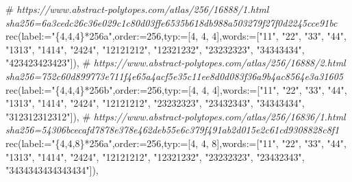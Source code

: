 \documentclass[
  10pt,
  letterpaper,
]{article}
\newenvironment{Shaded}{}{}
\newcommand{\CommentTok}[1]{\textcolor[rgb]{0.38,0.63,0.69}{\textit{#1}}}
\newcommand{\ExtensionTok}[1]{#1}
\newcommand{\FloatTok}[1]{\textcolor[rgb]{0.25,0.63,0.44}{#1}}
\newcommand{\NormalTok}[1]{#1}
\newcommand{\OperatorTok}[1]{\textcolor[rgb]{0.40,0.40,0.40}{#1}}
\newcommand{\StringTok}[1]{\textcolor[rgb]{0.25,0.44,0.63}{#1}}
\newcommand{\VariableTok}[1]{\textcolor[rgb]{0.10,0.09,0.49}{#1}}
\begin{document}
\begin{Shaded}
\begin{Highlighting}[]
\NormalTok{\#}\CommentTok{ https://www.abstract{-}polytopes.com/atlas/256/16888/1.html sha256=6a3cedc26c36e029c1c80d03ffe6535b618db988a503279f27f0d2245cce91bc}
\ExtensionTok{rec}\NormalTok{(}\VariableTok{label}\OperatorTok{:=}\StringTok{"\{4,4,4\}*256a"}\OperatorTok{,}\VariableTok{order}\OperatorTok{:=}\FloatTok{256}\OperatorTok{,}\VariableTok{typ}\OperatorTok{:=}\NormalTok{[}\FloatTok{4}\OperatorTok{,} \FloatTok{4}\OperatorTok{,} \FloatTok{4}\NormalTok{]}\OperatorTok{,}\VariableTok{words}\OperatorTok{:=}\NormalTok{[}\StringTok{"11"}\OperatorTok{,} \StringTok{"22"}\OperatorTok{,} \StringTok{"33"}\OperatorTok{,} \StringTok{"44"}\OperatorTok{,} \StringTok{"1313"}\OperatorTok{,} \StringTok{"1414"}\OperatorTok{,} \StringTok{"2424"}\OperatorTok{,} \StringTok{"12121212"}\OperatorTok{,} \StringTok{"12321232"}\OperatorTok{,} \StringTok{"23232323"}\OperatorTok{,} \StringTok{"34343434"}\OperatorTok{,} \StringTok{"423423423423"}\NormalTok{])}\OperatorTok{,}
\NormalTok{\#}\CommentTok{ https://www.abstract{-}polytopes.com/atlas/256/16888/2.html sha256=752c60d899773e711f4e65a4acf5e35c11ee8d0d083f36a9b4ac8564e3a31605}
\ExtensionTok{rec}\NormalTok{(}\VariableTok{label}\OperatorTok{:=}\StringTok{"\{4,4,4\}*256b"}\OperatorTok{,}\VariableTok{order}\OperatorTok{:=}\FloatTok{256}\OperatorTok{,}\VariableTok{typ}\OperatorTok{:=}\NormalTok{[}\FloatTok{4}\OperatorTok{,} \FloatTok{4}\OperatorTok{,} \FloatTok{4}\NormalTok{]}\OperatorTok{,}\VariableTok{words}\OperatorTok{:=}\NormalTok{[}\StringTok{"11"}\OperatorTok{,} \StringTok{"22"}\OperatorTok{,} \StringTok{"33"}\OperatorTok{,} \StringTok{"44"}\OperatorTok{,} \StringTok{"1313"}\OperatorTok{,} \StringTok{"1414"}\OperatorTok{,} \StringTok{"2424"}\OperatorTok{,} \StringTok{"12121212"}\OperatorTok{,} \StringTok{"23232323"}\OperatorTok{,} \StringTok{"23432343"}\OperatorTok{,} \StringTok{"34343434"}\OperatorTok{,} \StringTok{"312312312312"}\NormalTok{])}\OperatorTok{,}
\NormalTok{\#}\CommentTok{ https://www.abstract{-}polytopes.com/atlas/256/16836/1.html sha256=54306bcecafd7878e378e462deb55e6c379f491ab2d015e2c61cd9308828c8f1}
\ExtensionTok{rec}\NormalTok{(}\VariableTok{label}\OperatorTok{:=}\StringTok{"\{4,4,8\}*256a"}\OperatorTok{,}\VariableTok{order}\OperatorTok{:=}\FloatTok{256}\OperatorTok{,}\VariableTok{typ}\OperatorTok{:=}\NormalTok{[}\FloatTok{4}\OperatorTok{,} \FloatTok{4}\OperatorTok{,} \FloatTok{8}\NormalTok{]}\OperatorTok{,}\VariableTok{words}\OperatorTok{:=}\NormalTok{[}\StringTok{"11"}\OperatorTok{,} \StringTok{"22"}\OperatorTok{,} \StringTok{"33"}\OperatorTok{,} \StringTok{"44"}\OperatorTok{,} \StringTok{"1313"}\OperatorTok{,} \StringTok{"1414"}\OperatorTok{,} \StringTok{"2424"}\OperatorTok{,} \StringTok{"12121212"}\OperatorTok{,} \StringTok{"12321232"}\OperatorTok{,} \StringTok{"23232323"}\OperatorTok{,} \StringTok{"23432343"}\OperatorTok{,} \StringTok{"3434343434343434"}\NormalTok{])}\OperatorTok{,}

\end{Highlighting}
\end{Shaded}
\end{document}
